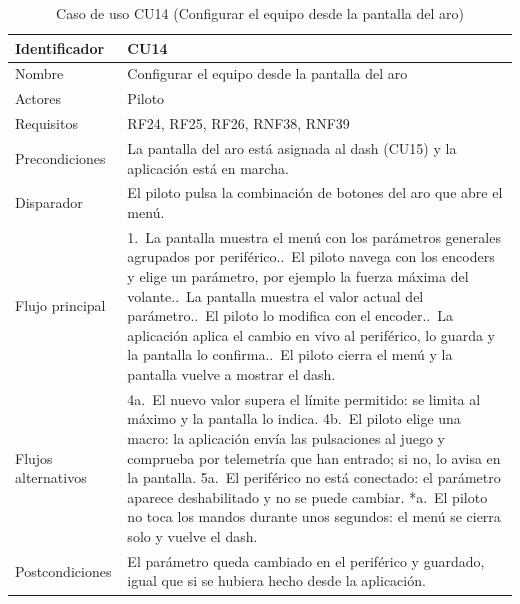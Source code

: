 \clearpage   %
\begin{table}[H]
	\centering
	\renewcommand{\arraystretch}{1.5}
	\begin{tabular}{|l|p{10cm}|}
		\hline
		Identificador & CU14 \\
		\hline
		Nombre & Configurar el equipo desde la pantalla del aro \\
		\hline
		Actores & Piloto \\
		\hline
		Requisitos & RF24, RF25, RF26, RNF38, RNF39 \\
		\hline
		Precondiciones & La pantalla del aro está asignada al dash (CU15) y la aplicación está en marcha. \\
		\hline
		Disparador & El piloto pulsa la combinación de botones del aro que abre el menú. \\
		\hline
		Flujo principal & 1.~La pantalla muestra el menú con los parámetros generales agrupados por periférico.\newline
		2.~El piloto navega con los encoders y elige un parámetro, por ejemplo la fuerza máxima del volante.\newline
		3.~La pantalla muestra el valor actual del parámetro.\newline
		4.~El piloto lo modifica con el encoder.\newline
		5.~La aplicación aplica el cambio en vivo al periférico, lo guarda y la pantalla lo confirma.\newline
		6.~El piloto cierra el menú y la pantalla vuelve a mostrar el dash. \\
		\hline
		Flujos alternativos & 4a.~El nuevo valor supera el límite permitido: se limita al máximo y la pantalla lo indica.\newline
		4b.~El piloto elige una macro: la aplicación envía las pulsaciones al juego y comprueba por telemetría que han entrado; si no, lo avisa en la pantalla.\newline
		5a.~El periférico no está conectado: el parámetro aparece deshabilitado y no se puede cambiar.\newline
		*a.~El piloto no toca los mandos durante unos segundos: el menú se cierra solo y vuelve el dash. \\
		\hline
		Postcondiciones & El parámetro queda cambiado en el periférico y guardado, igual que si se hubiera hecho desde la aplicación. \\
		\hline
	\end{tabular}
	\caption{Caso de uso CU14 (Configurar el equipo desde la pantalla del aro)}
	\label{tab:cu14}
\end{table}

